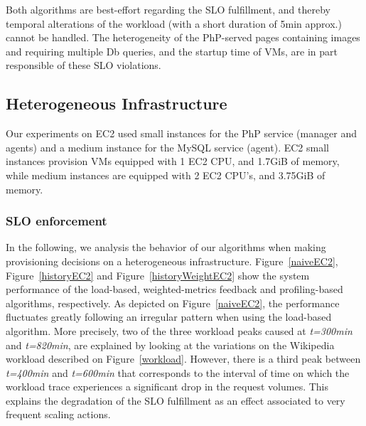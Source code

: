 Both algorithms are best-effort regarding the SLO fulfillment, and thereby temporal alterations of the workload (with a short duration of 5min approx.) cannot be handled. The heterogeneity of the PhP-served pages containing images and requiring multiple Db queries, and the startup time of VMs, are in part responsible of these SLO violations. 




\subsection{Heterogeneous Infrastructure}

Our experiments on EC2 used small instances for the PhP service (manager and agents) and  a medium instance for the MySQL service (agent). EC2 small instances provision VMs equipped with 1 EC2 CPU, and 1.7GiB of memory, while medium instances are equipped with 2 EC2 CPU's, and 3.75GiB of memory.

\subsubsection{SLO enforcement}

In the following, we analysis the behavior of our algorithms when making provisioning decisions on a heterogeneous infrastructure. Figure~\ref{naiveEC2}, Figure~\ref{historyEC2} and Figure~\ref{historyWeightEC2} show the system performance of the load-based, weighted-metrics feedback and profiling-based algorithms, respectively. As depicted on Figure~\ref{naiveEC2}, the performance fluctuates greatly following an irregular pattern when using the load-based algorithm. More precisely, two of the three workload peaks caused at \emph{t=300min} and \emph{t=820min}, are explained by looking at the variations on the Wikipedia workload described on Figure~\ref{workload}. However, there is a third peak between \emph{t=400min} and \emph{t=600min} that corresponds to the interval of time on which the workload trace experiences a significant drop in the request volumes. This explains the degradation of the SLO fulfillment as an effect associated to very frequent scaling actions. 

